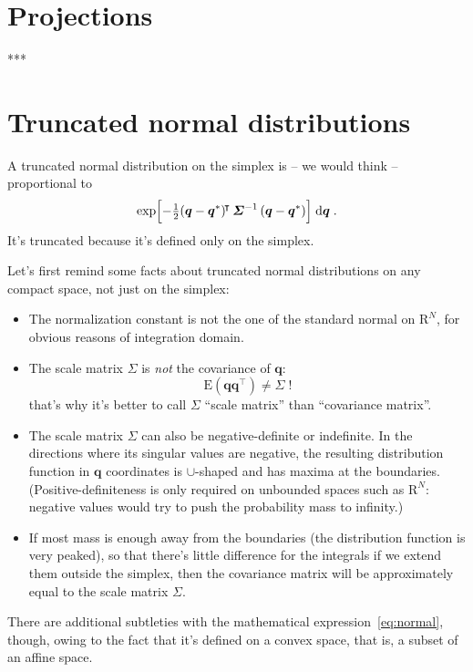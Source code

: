 \documentclass[\ifafour a4paper,12pt,\else a5paper,10pt,\fi%
onecolumn,oneside,article,%
british%
]{memoir}
\theoremstyle{remark}
\theoremstyle{innote}
\newcommand*{\di}{\mathrm{d}}%
\newcommand*{\RR}{\bm{\mathrm{R}}}
\newcommand*{\E}{\mathrm{E}}
\renewcommand*{\|}[1][]{\nonscript\,#1\vert\nonscript\;\mathopen{}}
\newcommand*{\T}{^{\mathord{\!\intercal}}}%
\newcommand*{\yq}{\bm{q}}
\newcommand*{\yqr}{\yq^{*}}
\newcommand*{\ySigma}{\bm{\varSigma}}
\begin{document}
\section{Projections}
\label{sec:projections}

***

\section{Truncated normal distributions}
\label{sec:normal_distr}

A truncated normal distribution on the simplex is -- we would think --
proportional to
\begin{equation}
  \label{eq:normal}
\exp\Bigl[-\tfrac{1}{2}
(\yq-\yqr)\T \, \ySigma^{-1}\, (\yq-\yqr)
  \Bigr] \;\di\yq\;.
\end{equation}
It's truncated because it's defined only on the simplex.

Let's first remind some facts about truncated normal distributions 
on any compact space, not just on the simplex:
\begin{itemize}
\item The normalization constant is not the one of the standard
  normal on $\RR^{N}$, for obvious reasons of integration domain.
\item The scale matrix $\ySigma$ is \emph{not} the covariance of $\yq$:
  \begin{equation}
    \label{eq:normal_not_cov}
    \E(\yq\yq\T) \ne \ySigma \;!
  \end{equation}
  that's why it's better to call $\ySigma$ \enquote{scale matrix} than
  \enquote{covariance matrix}.
\item The scale matrix $\ySigma$ can also be negative-definite or
  indefinite. In the directions where its singular values are negative, the
  resulting distribution function in $\yq$ coordinates is $\cup$-shaped and
  has maxima at the boundaries. (Positive-definiteness is only required on
  unbounded spaces such as $\RR^{N}$: negative values would try to push the
  probability mass to infinity.)
\item If most mass is enough away from the boundaries (the distribution
  function is very peaked), so that there's little difference for the
  integrals if we extend them outside the simplex, then the covariance
  matrix will be approximately equal to the scale matrix $\ySigma$.
\end{itemize}

There are additional subtleties with the mathematical
expression~\eqref{eq:normal}, though, owing to the fact that it's defined
on a convex space, that is, a subset of an affine space.
\end{document}
